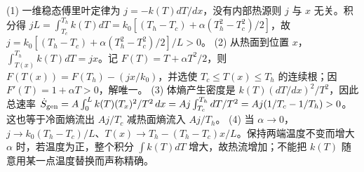 (1) 一维稳态傅里叶定律为 \(j=-k(T)dT/dx\)，没有内部热源则 \(j\) 与 \(x\) 无关。积分得 \(jL=\int_{T_c}^{T_h}k(T)dT=k_0[(T_h-T_c)+\alpha(T_h^2-T_c^2)/2]\)，故 \(j=k_0[(T_h-T_c)+\alpha(T_h^2-T_c^2)/2]/L>0\)。
(2) 从热面到位置 \(x\)，\(\int_{T(x)}^{T_h} k(T)dT=jx\)。记 \(F(T)=T+\alpha T^2/2\)，则 \(F(T(x))=F(T_h)-(jx/k_0)\)，并选使 \(T_c\le T(x)\le T_h\) 的连续根；因 \(F'(T)=1+\alpha T>0\)，解唯一。
(3) 体熵产生密度是 \(k(T)(dT/dx)^2/T^2\)，因此总速率 \(\dot S_{\rm gen}=A\int_0^L k(T)(T_x)^2/T^2\,dx=Aj\int_{T_c}^{T_h}dT/T^2=Aj(1/T_c-1/T_h)>0\)。这也等于冷面熵流出 \(Aj/T_c\) 减热面熵流入 \(Aj/T_h\)。
(4) 当 \(\alpha\to0\)，\(j\to k_0(T_h-T_c)/L\)、\(T(x)\to T_h-(T_h-T_c)x/L\)。保持两端温度不变而增大 \(\alpha\) 时，若温度为正，整个积分 \(\int k(T)dT\) 增大，故热流增加；不能把 \(k(T)\) 随意用某一点温度替换而声称精确。
